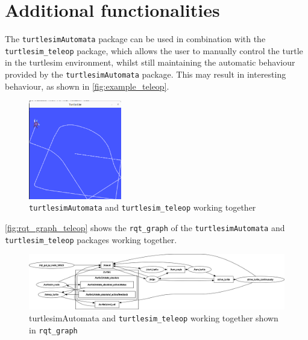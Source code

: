 \chapter{Additional functionalities}
\label{chapter:additional_functionalities}

The \texttt{turtlesimAutomata} package can be used in combination with the \texttt{turtlesim\_teleop} package, which allows the user to manually control the turtle in the turtlesim environment, whilst still maintaining the automatic behaviour provided by the \texttt{turtlesimAutomata} package. This may result in interesting behaviour, as shown in \autoref{fig:example_teleop}.

\begin{figure}[htbp]
    \centering
    \includegraphics[width=0.36\textwidth]{./img/turtle_teleop_example.png}
    \caption{\texttt{turtlesimAutomata} and \texttt{turtlesim\_teleop} working together}
    \label{fig:example_teleop}
\end{figure}

\autoref{fig:rqt_graph_teleop} shows the \texttt{rqt\_graph} of the \texttt{turtlesimAutomata} and \texttt{turtlesim\_teleop} packages working together.

\begin{figure}[htbp]
    \centering
    \includegraphics[width=1\textwidth]{./img/rosgraph_teleop.png}
    \caption{turtlesimAutomata and \texttt{turtlesim\_teleop} working together shown in \texttt{rqt\_graph}}
    \label{fig:rqt_graph_teleop}
\end{figure}

